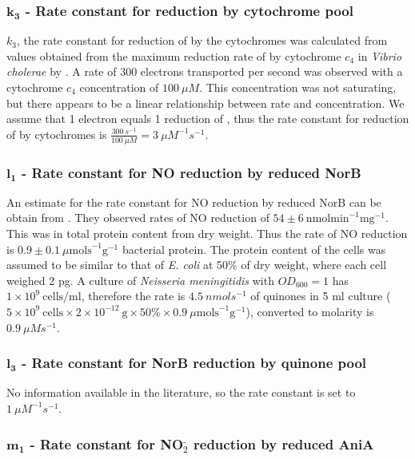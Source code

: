 \subsubsection*{$\mathbf{k_3}$ {\bf- Rate constant for \cbbthree{} reduction by cytochrome pool}}
$k_3$, the rate constant for reduction of \cbbthree{} by the cytochromes was calculated from values obtained from the maximum reduction rate of \cbbthree{} by cytochrome $c_4$ in \textit{Vibrio cholerae} by \citet{Chang2010}. A rate of 300 electrons transported per second was observed with a cytochrome $c_4$ concentration of $100~\mu M$. This concentration was not saturating, but there appears to be a linear relationship between rate and concentration. We assume that 1 electron equals 1 reduction of \cbbthree{}, thus the rate constant for reduction of \cbbthree{} by cytochromes is $\frac{300~s^{-1}}{100~\mu M} = 3~\mu M^{-1}s^{-1}$.

\subsubsection*{$\mathbf{l_1}$ {\bf- Rate constant for NO reduction by reduced NorB}}

An estimate for the rate constant for NO reduction by reduced NorB can be obtain from \citet{Rock2007}. They observed rates of NO reduction of $54 \pm 6~\mathrm{nmol min}^{-1} \mathrm{mg}^{-1}$. This was in total protein content from dry weight. Thus the rate of NO reduction is $0.9 \pm 0.1~\mu\mathrm{mol s}^{-1}\mathrm{g}^{-1}$ bacterial protein. The protein content of the cells was assumed to be similar to that of \textit{E. coli} at 50\% of dry weight, where each cell weighed 2 pg. A culture of \textit{Neisseria meningitidis} with $OD_{600} = 1$ has $1 \times 10^9~\textrm{cells/ml}$, therefore the rate is $4.5~nmols^{-1}$ of quinones in 5 ml culture ($5\times 10^9~\textrm{cells} \times 2\times 10^{-12}~\textrm{g} \times 50\% \times 0.9~\mu\mathrm{mol s}^{-1}\mathrm{g}^{-1}$), converted to molarity is $0.9~\mu Ms^{-1}$.

\subsubsection*{$\mathbf{l_3}$ {\bf- Rate constant for NorB reduction by quinone pool}}
No information available in the literature, so the rate constant is set to $1~\mu M^{-1}s^{-1}$.

\subsubsection*{$\mathbf{m_1}$ {\bf- Rate constant for NO$_{\textrm{2}}^{\textrm{-}}$ reduction by reduced AniA}}



